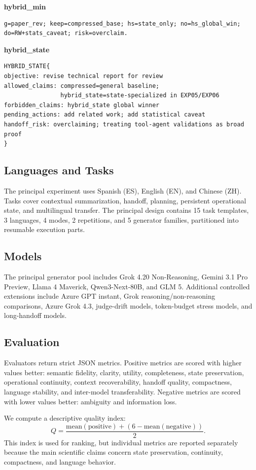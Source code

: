 \documentclass[11pt]{article}
\begin{document}
\noindent\textbf{hybrid\_min}
\begin{verbatim}
g=paper_rev; keep=compressed_base; hs=state_only; no=hs_global_win;
do=RW+stats_caveat; risk=overclaim.
\end{verbatim}

\noindent\textbf{hybrid\_state}
\begin{verbatim}
HYBRID_STATE{
objective: revise technical report for review
allowed_claims: compressed=general baseline;
                hybrid_state=state-specialized in EXP05/EXP06
forbidden_claims: hybrid_state global winner
pending_actions: add related work; add statistical caveat
handoff_risk: overclaiming; treating tool-agent validations as broad proof
}
\end{verbatim}

\subsection{Languages and Tasks}
The principal experiment uses Spanish (ES), English (EN), and Chinese (ZH). Tasks cover contextual summarization, handoff, planning, persistent operational state, and multilingual transfer. The principal design contains 15 task templates, 3 languages, 4 modes, 2 repetitions, and 5 generator families, partitioned into resumable execution parts.

\subsection{Models}
The principal generator pool includes Grok 4.20 Non-Reasoning, Gemini 3.1 Pro Preview, Llama 4 Maverick, Qwen3-Next-80B, and GLM 5. Additional controlled extensions include Azure GPT instant, Grok reasoning/non-reasoning comparisons, Azure Grok 4.3, judge-drift models, token-budget stress models, and long-handoff models.

\subsection{Evaluation}
Evaluators return strict JSON metrics. Positive metrics are scored with higher values better: semantic fidelity, clarity, utility, completeness, state preservation, operational continuity, context recoverability, handoff quality, compactness, language stability, and inter-model transferability. Negative metrics are scored with lower values better: ambiguity and information loss.

We compute a descriptive quality index:
\[
Q = \frac{\mathrm{mean}(\mathrm{positive}) + (6 - \mathrm{mean}(\mathrm{negative}))}{2}.
\]
This index is used for ranking, but individual metrics are reported separately because the main scientific claims concern state preservation, continuity, compactness, and language behavior.
\end{document}
